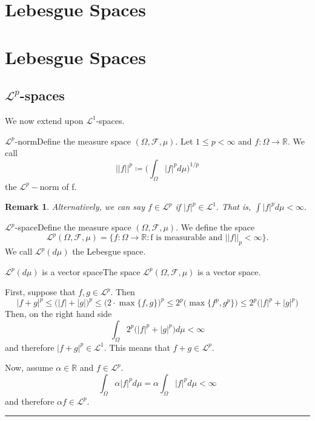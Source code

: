 \documentclass[twoside]{article}
\newtheorem{remark}[theorem]{Remark}
\newenvironment{proof}{{\bf Proof:}}{\hfill\rule{2mm}{2mm}}
\newcommand{\sigmalgebra}{\mathcal{F}}
\begin{document}
\section{Lebesgue Spaces}
\section{Lebesgue Spaces}
\subsection{$\mathcal{L}^p$-spaces}
We now extend upon $\mathcal{L}^1$-spaces.
\begin{definition_exam}{$\mathcal{L}^p$-norm}{}Define the measure space $(\Omega, \sigmalgebra, \mu)$. Let $1 \leq p < \infty$ and $f: \Omega \rightarrow \mathbb{R}.$ We call 
$$
||f||^p \coloneqq \bigg(\int_{\Omega}|f|^pd\mu \bigg)^{1/p}
$$
the $\mathcal{L}^p-$norm of f.
\end{definition_exam}

\begin{remark}Alternatively, we can say $f \in \mathcal{L}^p$ if $|f|^p \in \mathcal{L}^1.$ That is, $\int |f|^pd\mu < \infty.$
\end{remark}

\begin{definition_exam}{$\mathcal{L}^p$-space}{}Define the measure space $(\Omega, \sigmalgebra, \mu)$. We define the space 
$$
\mathcal{L}^p(\Omega, \sigmalgebra, \mu) = \{f:\Omega \rightarrow \mathbb{R}: \text{f is measurable and }||f||_p < \infty \}.
$$
We call $\mathcal{L}^p(d\mu)$ the Lebesgue space.
\end{definition_exam}

\begin{proposition_exam}{$\mathcal{L}^p(d\mu)$ is a vector space}{}The space $\mathcal{L}^p(\Omega, \mathcal{F},\mu)$ is a vector space.
\end{proposition_exam}

\begin{proof} First, suppose that $f, g \in \mathcal{L}^p.$ Then 
$$
|f + g|^p \leq \bigg(|f| + |g| \bigg)^p \leq \bigg(2 \cdot \max\{f, g\} \bigg)^p \leq 2^p\bigg( \max\{f^p, g^p\}\bigg) \leq 2^p\bigg(|f|^p + |g|^p \bigg)
$$
Then, on the right hand side
$$
\int_{\Omega} 2^p\bigg(|f|^p + |g|^p \bigg)d\mu < \infty
$$
and therefore $|f + g|^p \in \mathcal{L}^1.$ This means that $f + g \in \mathcal{L}^p.$ 

Now, assume $\alpha \in \mathbb{R}$ and $f \in \mathcal{L}^p.$
$$
\int_{\Omega} \alpha |f|^pd\mu = \alpha \int_{\Omega} |f|^pd\mu < \infty
$$
and therefore $\alpha f \in \mathcal{L}^p.$
\end{proof}
\end{document}

